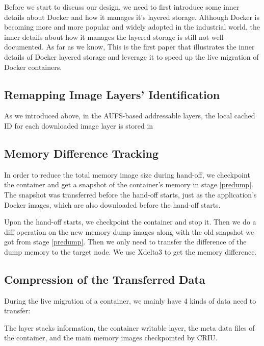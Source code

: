 Before we start to discuss our design, we need to first introduce some inner details about Docker and how it manages it's layered storage. Although Docker is becoming more and more popular and widely adopted in the industrial world, the inner details about how it manages the layered storage is still not well-documented. As far as we know, This is the first paper that illustrates the inner details of Docker layered storage and leverage it to speed up the live migration of Docker containers.





 
\subsection{Remapping Image Layers' Identification}

As we introduced above, in the AUFS-based addressable layers, the local cached ID for each downloaded image layer is stored in 


\subsection{Memory Difference Tracking}
In order to reduce the total memory image size during hand-off, we checkpoint the container and get a snapshot of the container's memory in stage \ref{predump}. The snapshot was transferred before the hand-off starts, just as the application's Docker images, which are also downloaded before the hand-off starts.

Upon the hand-off starts, we checkpoint the container and stop it. Then we do a diff operation on the new memory dump images along with the old snapshot we got from stage \ref{predump}. Then we only need to transfer the difference of the dump memory to the target node. We use Xdelta3 to get the memory difference.



\subsection{Compression of the Transferred Data}

During the live migration of a container, we mainly have 4 kinds of data need to transfer:

The layer stacks information, the container writable layer, the meta data files of the container, and the main memory images checkpointed by CRIU. 

